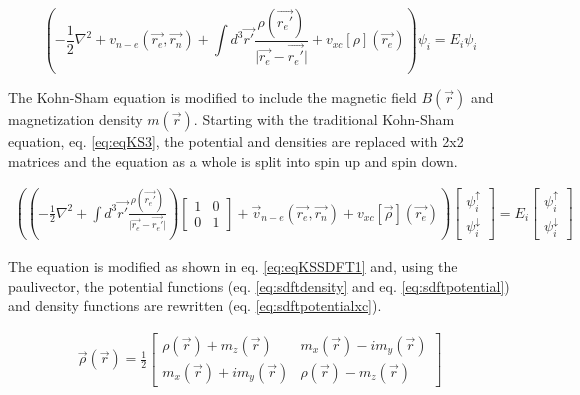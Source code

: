 \begin{equation}
\left( -\frac{1}{2} \nabla^2 + v_{n-e}(\vec{r_e}, \vec{r_n}) + \int d^3\vec{r'} \frac{\rho(\vec{r_{e}'})}{\lvert \vec{r_{e}} - \vec{r_{e}'} \rvert } + v_{xc}[\rho](\vec{r_{e}}) \right) \psi_{i} = E_{i} \psi_{i}
\label{eq:eqKS3}
\end{equation}

The Kohn-Sham equation is modified to include the magnetic field $B(\vec{r})$ and magnetization density $m(\vec{r})$\cite{spindft1}\cite{spindft2}.  Starting with the traditional Kohn-Sham equation, eq. \ref{eq:eqKS3}, the potential and densities are replaced with 2x2 matrices and the equation as a whole is split into spin up and spin down.

\begin{equation}
\begin{split}
\left(\left(-\frac{1}{2} \nabla^2  + \int d^3\vec{r'} \frac{\rho(\vec{r_{e}'})}{\lvert \vec{r_{e}} - \vec{r_{e}'} \rvert} \right) \begin{bmatrix} 1 & 0 \\ 0 & 1 \end{bmatrix} + \vec{v}_{n-e}(\vec{r_e}, \vec{r_n}) + v_{xc}[\vec{\rho}](\vec{r_{e}}) \right) \begin{bmatrix} \psi^{\uparrow}_{i} \\ \psi^{\downarrow}_{i} \end{bmatrix} = E_i \begin{bmatrix} \psi^{\uparrow}_{i} \\ \psi^{\downarrow}_{i} \end{bmatrix} 
\label{eq:eqKSSDFT1}
\end{split}
\end{equation}

The equation is modified as shown in eq. \ref{eq:eqKSSDFT1} and, using the \gls{paulivector}, the potential functions (eq. \ref{eq:sdftdensity} and eq. \ref{eq:sdftpotential})\cite{spindft4} and density functions are rewritten (eq. \ref{eq:sdftpotentialxc})\cite{spindft4}.

\begin{equation}
\begin{split}
\vec{\rho}(\vec{r}) = \frac{1}{2} \begin{bmatrix} \rho(\vec{r}) + m_z(\vec{r}) & m_x(\vec{r}) - i m_y(\vec{r}) \\ m_x(\vec{r}) + i m_y(\vec{r}) & \rho(\vec{r}) - m_z(\vec{r}) \end{bmatrix}
\label{eq:sdftdensity}
\end{split}
\end{equation}

